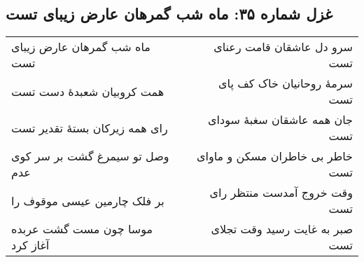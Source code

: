 \begin{center}
\section*{غزل شماره ۳۵: ماه شب گمرهان عارض زیبای تست}
\label{sec:035}
\begin{longtable}{l p{0.5cm} r}
ماه شب گمرهان عارض زیبای تست
&&
سرو دل عاشقان قامت رعنای تست
\\
همت کروبیان شعبدهٔ دست تست
&&
سرمهٔ روحانیان خاک کف پای تست
\\
رای همه زیرکان بستهٔ تقدیر تست
&&
جان همه عاشقان سغبهٔ سودای تست
\\
وصل تو سیمرغ گشت بر سر کوی عدم
&&
خاطر بی خاطران مسکن و ماوای تست
\\
بر فلک چارمین عیسی موقوف را
&&
وقت خروج آمدست منتظر رای تست
\\
موسا چون مست گشت عربده آغاز کرد
&&
صبر به غایت رسید وقت تجلای تست
\\
\end{longtable}
\end{center}
